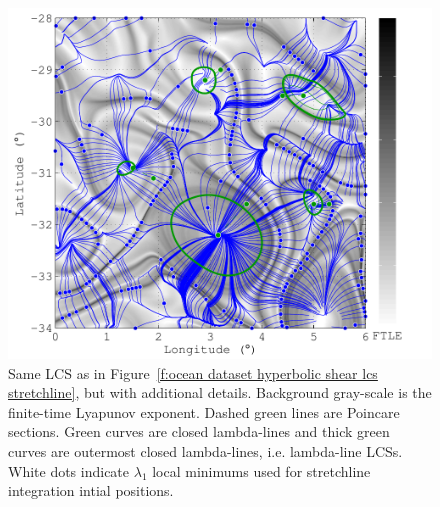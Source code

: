 \documentclass{article}
\begin{document}
\begin{figure}
\begin{center}
\includegraphics[width=\textwidth]{graphics/ocean_dataset/hyperbolic_shear_lcs_details_stretchline}
\end{center}
\caption{Same LCS as in Figure~\ref{f:ocean dataset hyperbolic shear lcs stretchline}, but with additional details. Background gray-scale is the finite-time Lyapunov exponent. Dashed green lines are Poincare sections. Green curves are closed lambda-lines and thick green curves are outermost closed lambda-lines, i.e. lambda-line LCSs. White dots indicate $\lambda_1$ local minimums used for stretchline integration intial positions.}
\label{f:ocean dataset hyperbolic shear lcs details stretchline}
\end{figure}



\end{document}
